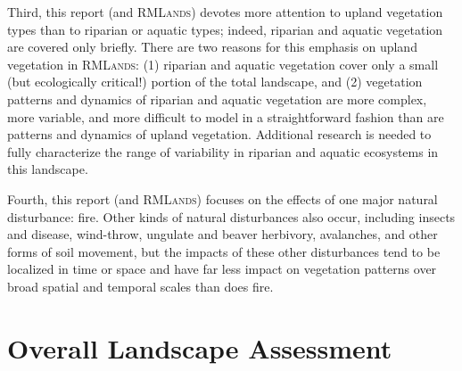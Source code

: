 Third, this report (and \textsc{RMLands}) devotes more attention to upland vegetation types than to riparian or aquatic types; indeed, riparian and aquatic vegetation are covered only briefly. There are two reasons for this emphasis on upland vegetation in \textsc{RMLands}: (1) riparian and aquatic vegetation cover only a small (but ecologically critical!) portion of the total landscape, and (2) vegetation patterns and dynamics of riparian and aquatic vegetation are more complex, more variable, and more difficult to model in a straightforward fashion than are patterns and dynamics of upland vegetation. Additional research is needed to fully characterize the range of variability in riparian and aquatic ecosystems in this landscape. 

Fourth, this report (and \textsc{RMLands}) focuses on the effects of one major natural disturbance: fire. Other kinds of natural disturbances also occur, including insects and disease, wind-throw, ungulate and beaver herbivory, avalanches, and other forms of soil movement, but the impacts of these other disturbances tend to be localized in time or space and have far less impact on vegetation patterns over broad spatial and temporal scales than does fire.


\clearpage
\section{Overall Landscape Assessment}

